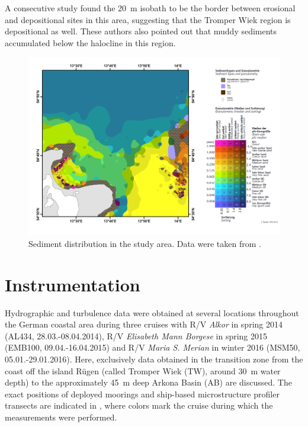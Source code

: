 A consecutive study \citep[][]{basys2} found the 20~m isobath to be the border 
between erosional and depositional sites in this area, suggesting that the 
Tromper Wiek region is depositional as well. These authors also pointed out that 
muddy sediments accumulated below the halocline in this region.

 \begin{figure}[ht]
\includegraphics[width=30pc]{bilder/TW.pdf}
 \caption{Sediment distribution in the study area. Data were taken from 
\cite{tauber2012}.}
 \label{tauberkarte}
 \end{figure}

\section{Instrumentation}

Hydrographic and turbulence data were obtained at several locations throughout 
the 
German coastal area during three cruises with R/V \textit{Alkor} in spring 2014 
(AL434, 28.03.-08.04.2014), R/V \textit{Elisabeth Mann Borgese} in spring 2015 
(EMB100, 09.04.-16.04.2015) and R/V \textit{Maria S. Merian} in winter 2016 
(MSM50, 05.01.-29.01.2016). Here, exclusively data obtained in the 
transition zone from the coast off 
the island R\"{u}gen (called Tromper Wiek (TW), around 30~m water depth) to 
the approximately 45~m deep Arkona Basin (AB) are discussed. The exact 
positions of deployed 
moorings and ship-based microstructure profiler transects are indicated in 
, where colors mark the cruise during which the measurements 
were performed.

